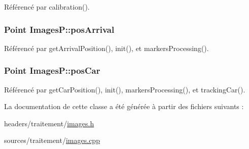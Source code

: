 Référencé par calibration().

\hypertarget{classImagesP_a621b649c63d3967849103c03082af64c}{
\subsubsection[{pos\-Arrival}]{\setlength{\rightskip}{0pt plus 5cm}Point Images\-P\-::pos\-Arrival}}\label{classImagesP_a621b649c63d3967849103c03082af64c}


Référencé par get\-Arrival\-Position(), init(), et markers\-Processing().

\hypertarget{classImagesP_a79d1d01bae703caeee1033425e4f8f18}{
\subsubsection[{pos\-Car}]{\setlength{\rightskip}{0pt plus 5cm}Point Images\-P\-::pos\-Car}}\label{classImagesP_a79d1d01bae703caeee1033425e4f8f18}


Référencé par get\-Car\-Position(), init(), markers\-Processing(), et tracking\-Car().



La documentation de cette classe a été générée à partir des fichiers suivants \-:\begin{DoxyCompactItemize}
\item 
headers/traitement/\hyperlink{images_8h}{images.\-h}\item 
sources/traitement/\hyperlink{images_8cpp}{images.\-cpp}\end{DoxyCompactItemize}
